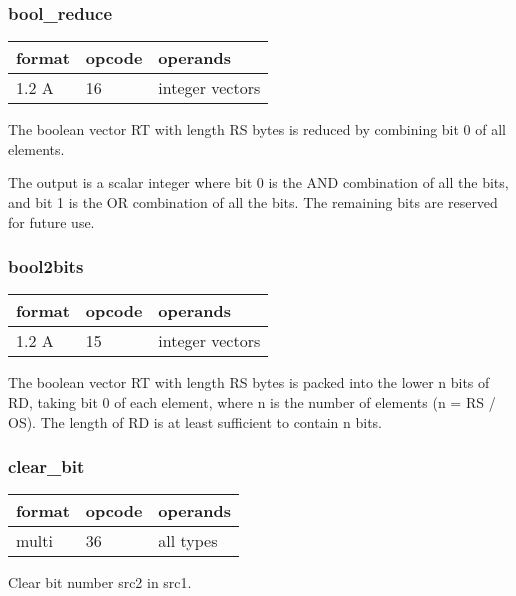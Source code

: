 \documentclass[forwardcom.tex]{subfiles}
\begin{document}
\subsubsection{bool\_reduce}
\label{table:boolReduceInstruction}
\begin{tabular}{|p{12mm}|p{12mm}|p{110mm}|}
\hline
\bfseries format & \bfseries opcode & \bfseries operands \\ \hline
1.2 A & 16 & integer vectors \\ \hline
\end{tabular}
\vspace{2mm}

The boolean vector RT with length RS bytes is reduced by combining bit 0 of all elements.

The output is a scalar integer where bit 0 is the AND combination of all the bits, and bit
1 is the OR combination of all the bits. The remaining bits are reserved for future use.

\subsubsection{bool2bits}
\label{table:bool2bitsInstruction}
\begin{tabular}{|p{12mm}|p{12mm}|p{110mm}|}
\hline
\bfseries format & \bfseries opcode & \bfseries operands \\ \hline
1.2 A & 15 & integer vectors \\ \hline
\end{tabular}
\vspace{2mm}

The boolean vector RT with length RS bytes is packed into the lower n bits of RD, taking bit 0 of each element, where n is the number of elements (n = RS / OS). 
The length of RD is at least sufficient to contain n bits.

\subsubsection{clear\_bit}
\label{table:clearBitInstruction}
\begin{tabular}{|p{12mm}|p{12mm}|p{110mm}|}
\hline
\bfseries format & \bfseries opcode & \bfseries operands \\ \hline
multi & 36 & all types \\ \hline
\end{tabular}
\vspace{2mm}

Clear bit number src2 in src1.
\vspace{2mm}
\end{document}
